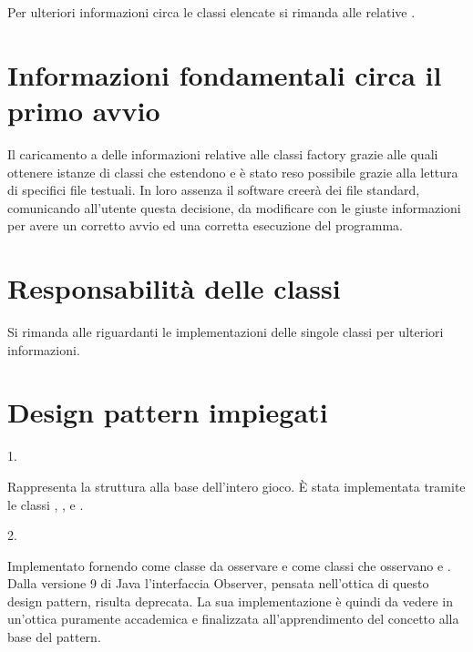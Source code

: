 \documentclass[letterpaper,10pt,italian]{sphinxmanual}
\begin{document}
Per ulteriori informazioni circa le classi elencate si rimanda alle relative {\hyperref[\detokenize{source/packages::doc}]{}}.


\section{Informazioni fondamentali circa il primo avvio}
\label{\detokenize{introduzione:informazioni-fondamentali-circa-il-primo-avvio}}
Il caricamento a  delle informazioni relative alle classi factory grazie alle quali ottenere istanze di classi che estendono
 e  è stato reso possibile grazie alla lettura di specifici file testuali. In loro assenza il software creerà
dei file standard, comunicando all’utente questa decisione, da modificare  con le giuste informazioni per avere un
corretto avvio ed una corretta esecuzione del programma.


\section{Responsabilità delle classi}
\label{\detokenize{introduzione:responsabilita-delle-classi}}
Si rimanda alle {\hyperref[\detokenize{source/packages::doc}]{}} riguardanti le implementazioni delle singole classi per ulteriori informazioni.


\section{Design pattern impiegati}
\label{\detokenize{introduzione:design-pattern-impiegati}}
1.  %
\begin{footnote}[2]\sphinxAtStartFootnote
{}
%
\end{footnote}
Rappresenta la struttura alla base dell’intero gioco. È stata implementata tramite le classi , ,  e .

2.  %
\begin{footnote}[3]\sphinxAtStartFootnote
{}
%
\end{footnote}
Implementato fornendo come classe da osservare  e come classi che osservano  e . Dalla versione 9 di Java l’interfaccia Observer, pensata nell’ottica di questo design pattern, risulta deprecata. La sua implementazione è quindi da vedere in un’ottica puramente accademica e finalizzata all’apprendimento del concetto alla base del pattern.
\end{document}
